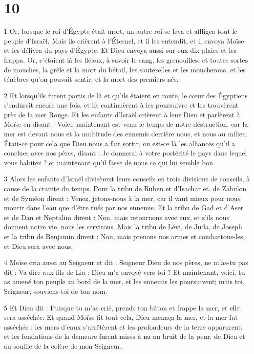 \chapter{10}

\par 1 Or, lorsque le roi d'Égypte était mort, un autre roi se leva et affligea tout le peuple d'Israël. Mais ils crièrent à l'Éternel, et il les entendit, et il envoya Moïse et les délivra du pays d'Égypte. Et Dieu envoya aussi sur eux dix plaies et les frappa. Or, c'étaient là les fléaux, à savoir le sang, les grenouilles, et toutes sortes de mouches, la grêle et la mort du bétail, les sauterelles et les moucherons, et les ténèbres qu'on pouvait sentir, et la mort des premiers-nés.

\par 2 Et lorsqu'ils furent partis de là et qu'ils étaient en route, le cœur des Égyptiens s'endurcit encore une fois, et ils continuèrent à les poursuivre et les trouvèrent près de la mer Rouge. Et les enfants d'Israël crièrent à leur Dieu et parlèrent à Moïse en disant : Voici, maintenant est venu le temps de notre destruction, car la mer est devant nous et la multitude des ennemis derrière nous, et nous au milieu. Était-ce pour cela que Dieu nous a fait sortir, ou est-ce là les alliances qu'il a conclues avec nos pères, disant : Je donnerai à votre postérité le pays dans lequel vous habitez ? et maintenant qu'il fasse de nous ce qui lui semble bon.

\par 3 Alors les enfants d'Israël divisèrent leurs conseils en trois divisions de conseils, à cause de la crainte du temps. Pour la tribu de Ruben et d'Isachar et. de Zabulon et de Syméon dirent : Venez, jetons-nous à la mer, car il vaut mieux pour nous mourir dans l'eau que d'être tués par nos ennemis. Et la tribu de Gad et d'Aser et de Dan et Neptalim dirent : Non, mais retournons avec eux, et s'ils nous donnent notre vie, nous les servirons. Mais la tribu de Lévi, de Juda, de Joseph et la tribu de Benjamin dirent : Non, mais prenons nos armes et combattons-les, et Dieu sera avec nous.

\par 4 Moïse cria aussi au Seigneur et dit : Seigneur Dieu de nos pères, ne m'as-tu pas dit : Va dire aux fils de Lia : Dieu m'a envoyé vers toi ? Et maintenant, voici, tu as amené ton peuple au bord de la mer, et les ennemis les poursuivent; mais toi, Seigneur, souviens-toi de ton nom.

\par 5 Et Dieu dit : Puisque tu m'as crié, prends ton bâton et frappe la mer, et elle sera asséchée. Et quand Moïse fit tout cela, Dieu menaça la mer, et la mer fut asséchée : les mers d'eaux s'arrêtèrent et les profondeurs de la terre apparurent, et les fondations de la demeure furent mises à nu au bruit de la peur. de Dieu et au souffle de la colère de mon Seigneur.

